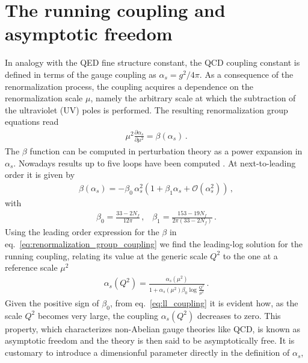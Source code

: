 \section{The running coupling and asymptotic freedom}
%
In analogy with the QED fine structure constant,
the QCD coupling constant is defined in terms of the gauge coupling as $\alpha_s = g^2/4\pi$.
As a consequence of the renormalization process, the coupling acquires a dependence on the renormalization scale $\mu$,
namely the arbitrary scale at which the subtraction of the ultraviolet (UV) poles is performed. 
The resulting renormalization group equations read
\begin{align}
    \label{eq:renormalization_group_coupling}
    \mu^2\frac{\partial\alpha_s}{\partial \mu^2} = \beta\left(\alpha_s\right)\,.
\end{align}
The $\beta$ function can be computed in perturbation theory as a power expansion in $\alpha_s$. 
Nowadays results up to five loops have been computed \cite{Herzog:2017ohr}.
At next-to-leading order it is given by
\begin{align}
    \label{eq:beta_function_expansion}
    \beta\left(\alpha_s\right) = -\beta_0\,\alpha_s^2\left(1+ \beta_1 \alpha_s + \mathcal{O}\left(\alpha_s^2\right)\right)\,,
\end{align}
with
\begin{align}
    \label{eq:beta_function_coefficients}
    \beta_0 = \frac{33 - 2 N_f}{12\pi}\,,\,\,\,\,\,
    \beta_1 = \frac{153 -19 N_f}{2\pi\left(33-2 N_f\right)}\,.
\end{align}
Using the leading order expression for the $\beta$ in eq.~\eqref{eq:renormalization_group_coupling} we find the leading-log
solution for the running coupling, relating its value at the generic scale $Q^2$ to the one at a reference scale
$\mu^2$ 
\begin{align}
    \label{eq:ll_coupling}
    \alpha_s\left(Q^2\right) = \frac{\alpha_s\left(\mu^2\right)}{1+\alpha_s\left(\mu^2\right)\beta_0\log\frac{Q^2}{\mu^2}}\,.
\end{align}
Given the positive sign of $\beta_0$, from eq.~\eqref{eq:ll_coupling} it is evident how, as the scale $Q^2$ becomes very large, 
the coupling $\alpha_s\left(Q^2\right)$ decreases to zero. This property, which characterizes non-Abelian gauge theories 
like QCD, is known as asymptotic freedom and the theory is then said to be asymptotically free.
It is customary to introduce a dimensionful parameter directly in the definition of $\alpha_s$,
